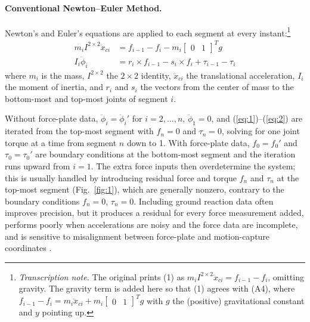 \documentclass[11pt]{article}
\newcommand{\tnote}[1]{\footnote{\textit{Transcription note.} #1}}
\begin{document}
\paragraph{Conventional Newton--Euler Method.} Newton's and Euler's equations
are applied to each segment at every instant:\tnote{The original prints (1)
as $m_iI^{2\times2}\ddot{x}_{ci}=f_{i-1}-f_i$, omitting gravity. The gravity
term is added here so that (1) agrees with (A4), where $f_{i-1}-f_i=
m_i\ddot{x}_{ci}+m_i\begin{bmatrix}0 & 1\end{bmatrix}^Tg$ with $g$ the
(positive) gravitational constant and $y$ pointing up.}
\begin{align}
m_iI^{2\times2}\ddot{x}_{ci} &= f_{i-1} - f_i
- m_i\begin{bmatrix}0 & 1\end{bmatrix}^T g \label{eq:1}\\
I_i\ddot{\phi}_i &= r_i\times f_{i-1} - s_i\times f_i + \tau_{i-1} - \tau_i
\label{eq:2}
\end{align}
where $m_i$ is the mass, $I^{2\times2}$ the $2\times2$ identity, $\ddot{x}_{ci}$
the translational acceleration, $I_i$ the moment of inertia, and $r_i$ and
$s_i$ the vectors from the center of mass to the bottom-most and top-most
joints of segment $i$.

Without force-plate data, $\ddot{\phi}_i=\ddot{\phi}_i'$ for $i=2,\ldots,n$,
$\ddot{\phi}_1=0$, and (\ref{eq:1})--(\ref{eq:2}) are iterated from the
top-most segment with $f_n=0$ and $\tau_n=0$, solving for one joint torque at
a time from segment $n$ down to 1. With force-plate data, $f_0=f_0'$ and
$\tau_0=\tau_0'$ are boundary conditions at the bottom-most segment and the
iteration runs upward from $i=1$. The extra force inputs then overdetermine
the system; this is usually handled by introducing residual force and torque
$f_n$ and $\tau_n$ at the top-most segment (Fig.~\ref{fig:1}), which are
generally nonzero, contrary to the boundary conditions $f_n=0$, $\tau_n=0$.
Including ground reaction data often improves precision, but it produces a
residual for every force measurement added, performs poorly when
accelerations are noisy and the force data are incomplete, and is sensitive
to misalignment between force-plate and motion-capture coordinates
\cite{McCawDeVita1995}.
\end{document}
